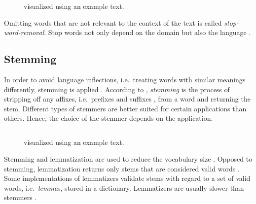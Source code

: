 \begin{figure}[!htb] %
    \centering
    
    \caption[\stopWordRemoval{}]{\stopWordRemoval{} visualized using an example text.}
    \label{fig:preproc-stop-word-removal}
\end{figure}

Omitting words that are not relevant to the context of the text is called \textit{stop-word-removal}.
Stop words not only depend on the domain but also the language \cite{IR2011}.


\subsection{Stemming}\label{subsec:stemming}

In order to avoid language inflections, i.e.\ treating words with similar meanings differently, stemming is applied \cite{clusteringDocs2020}.
According to \citeauthor{nlp-book2009}, \textit{stemming} is the process of stripping off any affixes, i.e.\ prefixes and suffixes \cite{IR2011}, 
from a word and returning the stem.
Different types of stemmers are better suited for certain applications than others.
Hence, the choice of the stemmer depends on the application.



\subsection{\Lemmatization{}}\label{subsec:lemmatization}

\begin{figure}[!htb] %
    \centering
    
    \caption[\Lemmatization{}]{\Lemmatization{} visualized using an example text.}
    \label{fig:preproc-lemmatization}
\end{figure}

Stemming and lemmatization are used to reduce the vocabulary size \cite{clusteringDocs2020}.
Opposed to stemming, lemmatization returns only stems that are considered valid words \cite{nlp-book2009}.
Some implementations of lemmatizers validate stems with regard to a set of valid words, i.e.\ \textit{lemma}s, stored in a dictionary.
Lemmatizers are usually slower than stemmers \cite{nlp-book2009}.

